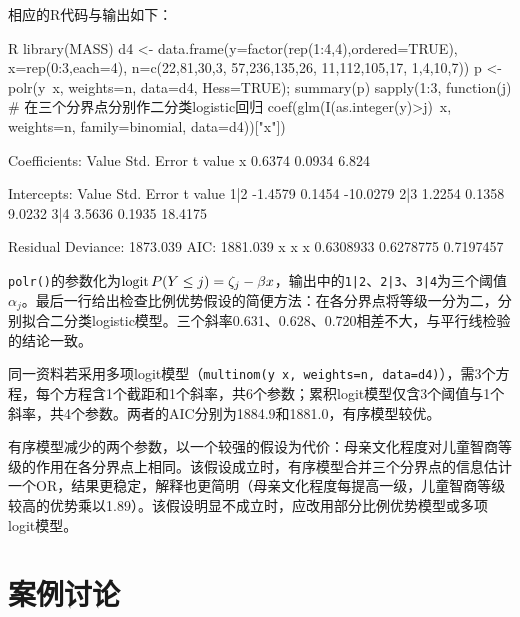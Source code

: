 相应的R代码与输出如下：
\par\noindent
\begin{coursecode}{R}
library(MASS)
d4 <- data.frame(y=factor(rep(1:4,4),ordered=TRUE), x=rep(0:3,each=4),
                 n=c(22,81,30,3, 57,236,135,26, 11,112,105,17, 1,4,10,7))
p <- polr(y~x, weights=n, data=d4, Hess=TRUE); summary(p)
sapply(1:3, function(j)        # 在三个分界点分别作二分类logistic回归
  coef(glm(I(as.integer(y)>j)~x, weights=n, family=binomial, data=d4))["x"])
\end{coursecode}
\begin{routput}
Coefficients:
   Value Std. Error t value
x 0.6374     0.0934   6.824

Intercepts:
    Value    Std. Error t value 
1|2  -1.4579   0.1454   -10.0279
2|3   1.2254   0.1358     9.0232
3|4   3.5636   0.1935    18.4175

Residual Deviance: 1873.039 
AIC: 1881.039 
        x         x         x 
0.6308933 0.6278775 0.7197457
\end{routput}
\texttt{polr()}的参数化为$\operatorname{logit} P(Y\le j)=\zeta_j-\beta x$，输出中的\texttt{1|2}、\texttt{2|3}、\texttt{3|4}为三个阈值$\alpha_j$。最后一行给出检查比例优势假设的简便方法：在各分界点将等级一分为二，分别拟合二分类logistic模型。三个斜率0.631、0.628、0.720相差不大，与平行线检验的结论一致。

\begin{sikao}[有序模型与多项logit模型的比较]
同一资料若采用多项logit模型（\texttt{multinom(y~x, weights=n, data=d4)}），需3个方程，每个方程含1个截距和1个斜率，共6个参数；累积logit模型仅含3个阈值与1个斜率，共4个参数。两者的AIC分别为1884.9和1881.0，有序模型较优。

有序模型减少的两个参数，以一个较强的假设为代价：母亲文化程度对儿童智商等级的作用在各分界点上相同。该假设成立时，有序模型合并三个分界点的信息估计一个OR，结果更稳定，解释也更简明（母亲文化程度每提高一级，儿童智商等级较高的优势乘以1.89）。该假设明显不成立时，应改用部分比例优势模型或多项logit模型。
\end{sikao}
\section{案例讨论}
